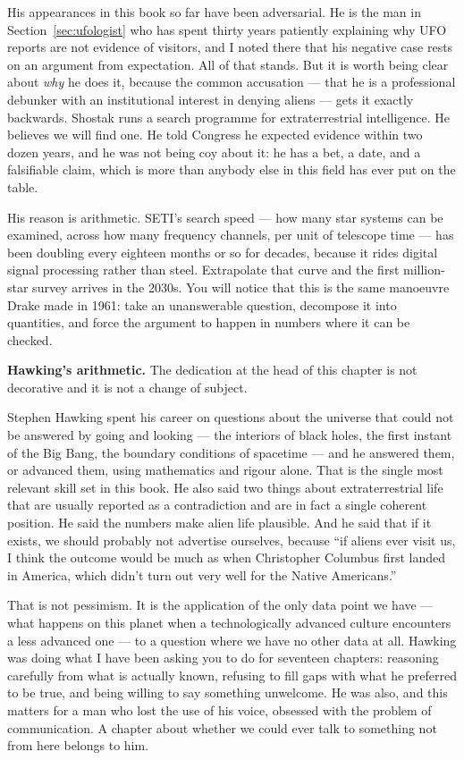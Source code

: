 His appearances in this book so far have been adversarial. He is the man in
Section~\ref{sec:ufologist} who has spent thirty years patiently explaining why UFO reports are not
evidence of visitors, and I noted there that his negative case rests on an argument from
expectation. All of that stands. But it is worth being clear about \emph{why} he does it, because
the common accusation --- that he is a professional debunker with an institutional interest in
denying aliens --- gets it exactly backwards. Shostak runs a search programme for extraterrestrial
intelligence. He believes we will find one. He told Congress he expected evidence within two dozen
years, and he was not being coy about it: he has a bet, a date, and a falsifiable claim, which is
more than anybody else in this field has ever put on the table.

His reason is arithmetic. SETI's search speed --- how many star systems can be examined, across how
many frequency channels, per unit of telescope time --- has been doubling every eighteen months or so
for decades, because it rides digital signal processing rather than steel. Extrapolate that curve and
the first million-star survey arrives in the 2030s.  You will notice that this is the same manoeuvre Drake made
in 1961: take an unanswerable question, decompose it into quantities, and force the argument to happen
in numbers where it can be checked.

\medskip\noindent\textbf{Hawking's arithmetic.}
The dedication at the head of this chapter is not decorative and it is not a change of subject.

Stephen Hawking spent his career on questions about the universe that could not be answered by going
and looking --- the interiors of black holes, the first instant of the Big Bang, the boundary
conditions of spacetime --- and he answered them, or advanced them, using mathematics and rigour
alone. That is the single most relevant skill set in this book. He also said two things about
extraterrestrial life that are usually reported as a contradiction and are in fact a single coherent
position. He said the numbers make alien life plausible. And he said that if it exists, we should
probably not advertise ourselves, because ``if aliens ever visit us, I think the outcome would be
much as when Christopher Columbus first landed in America, which didn't turn out very well for the
Native Americans.''

That is not pessimism. It is the application of the only data point we have --- what happens on this
planet when a technologically advanced culture encounters a less advanced one --- to a question where
we have no other data at all. Hawking was doing what I have been asking you to do for seventeen
chapters: reasoning carefully from what is actually known, refusing to fill gaps with what he
preferred to be true, and being willing to say something unwelcome. He was also, and this matters for
a man who lost the use of his voice, obsessed with the problem of communication. A chapter about
whether we could ever talk to something not from here belongs to him.

